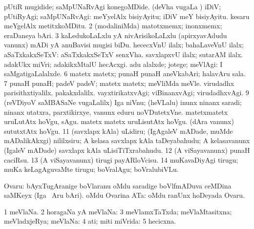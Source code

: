 \noindent
\gl{\pagu}
\bmng
{} 
\bnum
{}  
\banum
{} pUtiR mugidide; saMpUNaRvAgi konegoMDide. 
 (deVha \mo vugaLa \vi) iDiV; pUtiRyAgi; saMpUNaRvAgi:  meYyelAlx bisiyAyitu; iDiV meY bisiyAyitu.  kesaru meYgelAlx metitxkoMDitu. 
\eanum
\numie
\num{2}  (modaliniMda) matotxmemx; inonxmemx; eraDaneya bAri. 
\num{3}  kaLedukoLaLxlu yA nivArisikoLaLxlu (apirxyavAdudu \mo vanunx) mADi yA anuBavisi mugisi biDu. 
  
\banum
{} hececxVnU ilalx; bahaLaveVnU ilalx; aSaTxkakxSeTxV:  aSaTxkakxSeTxV senxVha. 
 savxlapxvU ilalx; sutarAM ilalx. 
\eanum
\numie
{}  
\banum
{} adakUkx miVri; adakikxMtalU hecAcxgi. 
 adu alalxde; jotege; meVlAgi:  I saMgatigaLalalxde. 
\eanum
\numie
\num{6}  matetx matetx; punaH punaH aneVkabAri; halavAru sala. 
\num{7}  punaH punaH; padeV padeV; matetx matetx; meVliMda meVle. 
  
\banum
{} virudadhx parisithxtiyalilx. 
 pakakxdalilx. 
 vayxtirikatxvAgi; viBinanxvAgi; virudadhxvAgi. 
\eanum
\numie
\num{9} (reVDiyoV saMBASaNe \mo vugaLalilx) Iga niVnu; (heVLalu) inunx ninanx saradi; ninanx utatxra, parxtikirxye, \mo vanunx eduru noVDutetxVne. 
  
\banum
{} matetxmatetx uruLutAtx hoVgu, sAgu. 
 matetx matetx uruLisutAtx hoVgu. 
 (dAra \mo vanunx) sututxtAtx hoVgu. 
\eanum
\numie
\num{11}  (savxlapx kAla) uLidiru; (IgAgaleV mADade, muMde mADalikAkxgi) nililxsiru;  A kelasa savxlapx kAla taDeyabahudu; A kelasavanunx (IgaleV mADade) savxlapx kAla uLisiTiTxrabahudu. 
\num{12}  (A viSayavanunx) punaH caciRsu. 
\num{13}  (A viSayavanunx) tirugi payARloVcisu. 
\num{14}  muKavaDiyAgi tirugu; muKa keLagAguvaMte tirugu; boVralAgu; boVralubiVLu. 
\enum
\emng
\eentry

\bentry
{}
\gl{\nA}
\bmng
Ovaru: 
\banum
{} bAyxTugAranige boVlaranu oMdu saradige boVlfmADuva ceMDina saMKeyx (Iga \sA\ Aru bAri). 
 oMdu Ovarina ATa:  oMdu ranUnx hoDeyada Ovaru. 
\eanum
\emng
\eentry

\bentry
{}
\gl{\gu}
\bmng
\bnum
\num{1} meVlaNa. 
\num{2} horagaNa yA meVlaNa:  
\num{3} meVlamxTaTxda; meVlaMtasitxna; meVladxjeRya; meVlaNa:  
\num{4} ati; miti miVrida:  
\num{5} hecicxna. 
\enum
\emng
\eentry

